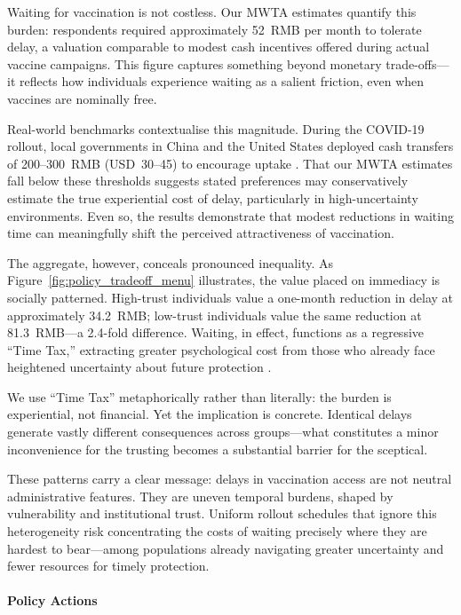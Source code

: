 \documentclass[preprint,12pt]{elsarticle}
\begin{document}
Waiting for vaccination is not costless. Our MWTA estimates quantify this burden: respondents required approximately 52~RMB per month to tolerate delay, a valuation comparable to modest cash incentives offered during actual vaccine campaigns. This figure captures something beyond monetary trade-offs---it reflects how individuals experience waiting as a salient friction, even when vaccines are nominally free.

Real-world benchmarks contextualise this magnitude. During the COVID-19 rollout, local governments in China and the United States deployed cash transfers of 200--300~RMB (USD~30--45) to encourage uptake \cite{Meng2021,Thirumurthy2022}. That our MWTA estimates fall below these thresholds suggests stated preferences may conservatively estimate the true experiential cost of delay, particularly in high-uncertainty environments. Even so, the results demonstrate that modest reductions in waiting time can meaningfully shift the perceived attractiveness of vaccination.

The aggregate, however, conceals pronounced inequality. As Figure~\ref{fig:policy_tradeoff_menu} illustrates, the value placed on immediacy is socially patterned. High-trust individuals value a one-month reduction in delay at approximately 34.2~RMB; low-trust individuals value the same reduction at 81.3~RMB---a 2.4-fold difference. Waiting, in effect, functions as a regressive ``Time Tax,'' extracting greater psychological cost from those who already face heightened uncertainty about future protection \cite{Betsch2018}.

We use ``Time Tax'' metaphorically rather than literally: the burden is experiential, not financial. Yet the implication is concrete. Identical delays generate vastly different consequences across groups---what constitutes a minor inconvenience for the trusting becomes a substantial barrier for the sceptical.

These patterns carry a clear message: delays in vaccination access are not neutral administrative features. They are uneven temporal burdens, shaped by vulnerability and institutional trust. Uniform rollout schedules that ignore this heterogeneity risk concentrating the costs of waiting precisely where they are hardest to bear---among populations already navigating greater uncertainty and fewer resources for timely protection.
\paragraph{Policy Actions}
\end{document}

